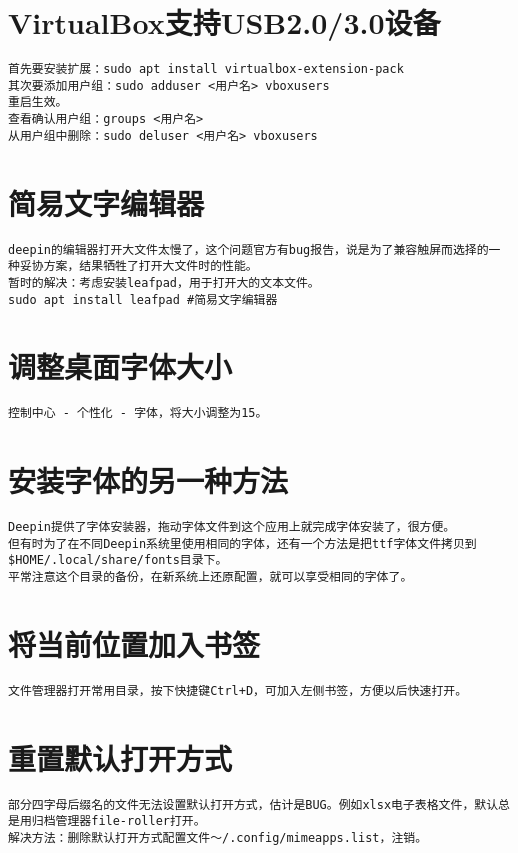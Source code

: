 \documentclass[a4paper,fontset=fandol,zihao=-4,linespread=1.2]{ctexbook}
\begin{document}
\section{VirtualBox支持USB2.0/3.0设备}
\begin{lstlisting}
首先要安装扩展：sudo apt install virtualbox-extension-pack
其次要添加用户组：sudo adduser <用户名> vboxusers
重启生效。
查看确认用户组：groups <用户名>
从用户组中删除：sudo deluser <用户名> vboxusers
\end{lstlisting}

\section{简易文字编辑器}
\begin{lstlisting}
deepin的编辑器打开大文件太慢了，这个问题官方有bug报告，说是为了兼容触屏而选择的一种妥协方案，结果牺牲了打开大文件时的性能。
暂时的解决：考虑安装leafpad，用于打开大的文本文件。
sudo apt install leafpad #简易文字编辑器
\end{lstlisting}

\section{调整桌面字体大小}
\begin{lstlisting}
控制中心 - 个性化 - 字体，将大小调整为15。
\end{lstlisting}

\section{安装字体的另一种方法}
\begin{lstlisting}
Deepin提供了字体安装器，拖动字体文件到这个应用上就完成字体安装了，很方便。
但有时为了在不同Deepin系统里使用相同的字体，还有一个方法是把ttf字体文件拷贝到$HOME/.local/share/fonts目录下。
平常注意这个目录的备份，在新系统上还原配置，就可以享受相同的字体了。
\end{lstlisting}

\section{将当前位置加入书签}
\begin{lstlisting}
文件管理器打开常用目录，按下快捷键Ctrl+D，可加入左侧书签，方便以后快速打开。
\end{lstlisting}

\section{重置默认打开方式}
\begin{lstlisting}
部分四字母后缀名的文件无法设置默认打开方式，估计是BUG。例如xlsx电子表格文件，默认总是用归档管理器file-roller打开。
解决方法：删除默认打开方式配置文件～/.config/mimeapps.list，注销。
\end{lstlisting}
\end{document}
